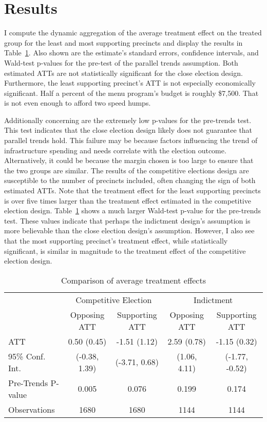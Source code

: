 \section{Results}\label{sec:results}


I compute the dynamic aggregation of the average treatment effect on the treated group for the least and most supporting precincts and display the results in Table~\ref{tab:att_comparison_combined}.
Also shown are the estimate's standard errors, confidence intervals, and Wald-test p-values for the pre-test of the parallel trends assumption.
Both estimated ATTs are not statistically significant for the close election design.
Furthermore, the least supporting precinct's ATT is not especially economically significant. 
Half a percent of the menu program's budget is roughly \$7,500. 
That is not even enough to afford two speed humps.

Additionally concerning are the extremely low p-values for the pre-trends test.
This test indicates that the close election design likely does not guarantee that parallel trends hold.
This failure may be because factors influencing the trend of infrastructure spending and needs correlate with the election outcome.
Alternatively, it could be because the margin chosen is too large to ensure that the two groups are similar.
The results of the competitive elections design are susceptible to the number of precincts included, often changing the sign of both estimated ATTs.
Note that the treatment effect for the least supporting precincts is over five times larger than the treatment effect estimated in the competitive election design.
Table~\ref{tab:att_comparison_combined} shows a much larger Wald-test p-value for the pre-trends test.
These values indicate that perhaps the indictment design's assumption is more believable than the close election design's assumption.
However, I also see that the most supporting precinct's treatment effect, while statistically significant, is similar in magnitude to the treatment effect of the competitive election design.

\begin{table}[H]
    \centering
    \caption{Comparison of average treatment effects}
    \label{tab:att_comparison_combined}
    \begin{tabular}{lcc|cc}
    \hline
     & \multicolumn{2}{c|}{Competitive Election} & \multicolumn{2}{c}{Indictment} \\
     & Opposing ATT & Supporting ATT & Opposing ATT & Supporting ATT \\
    \hline
    ATT & 0.50 (0.45) & -1.51 (1.12) & 2.59 (0.78) & -1.15 (0.32) \\
    95\% Conf. Int. & (-0.38, 1.39) & (-3.71, 0.68) & (1.06, 4.11) & (-1.77, -0.52) \\
    Pre-Trends P-value & 0.005  & 0.076 & 0.199 & 0.174 \\
    Observations & 1680 & 1680 & 1144 & 1144 \\
    \hline
    \end{tabular}
\end{table}

